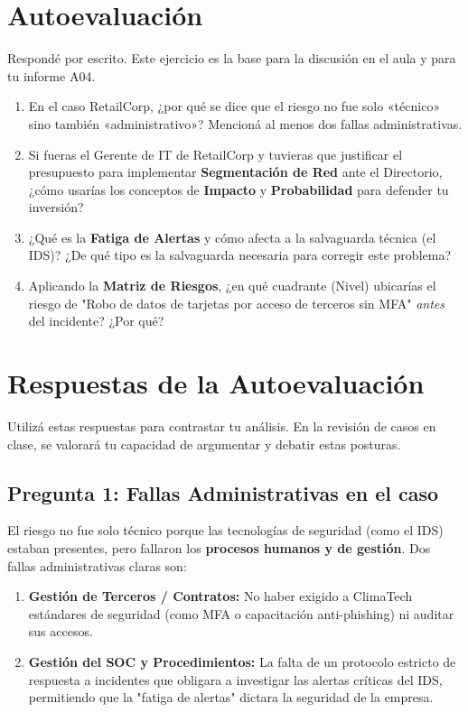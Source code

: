 \documentclass[11pt,a4paper]{article}
\begin{document}
\section{Autoevaluación}\label{sec:autoeval}
Respondé por escrito. Este ejercicio es la base para la discusión en el aula y para tu informe A04.

\begin{enumerate}[leftmargin=*]
  \item En el caso RetailCorp, ¿por qué se dice que el riesgo no fue solo «técnico» sino también «administrativo»? Mencioná al menos dos fallas administrativas.
  \item Si fueras el Gerente de IT de RetailCorp y tuvieras que justificar el presupuesto para implementar \textbf{Segmentación de Red} ante el Directorio, ¿cómo usarías los conceptos de \textbf{Impacto} y \textbf{Probabilidad} para defender tu inversión?
  \item ¿Qué es la \textbf{Fatiga de Alertas} y cómo afecta a la salvaguarda técnica (el IDS)? ¿De qué tipo es la salvaguarda necesaria para corregir este problema?
  \item Aplicando la \textbf{Matriz de Riesgos}, ¿en qué cuadrante (Nivel) ubicarías el riesgo de "Robo de datos de tarjetas por acceso de terceros sin MFA" \textit{antes} del incidente? ¿Por qué?
\end{enumerate}

\section{Respuestas de la Autoevaluación}\label{sec:respuestas}

\begin{clave}
Utilizá estas respuestas para contrastar tu análisis. En la revisión de casos en clase, se valorará tu capacidad de argumentar y debatir estas posturas.
\end{clave}

\subsection*{Pregunta 1: Fallas Administrativas en el caso}
\begin{respuesta}
El riesgo no fue solo técnico porque las tecnologías de seguridad (como el IDS) estaban presentes, pero fallaron los \textbf{procesos humanos y de gestión}. 
Dos fallas administrativas claras son:
\begin{enumerate}
  \item \textbf{Gestión de Terceros / Contratos:} No haber exigido a ClimaTech estándares de seguridad (como MFA o capacitación anti-phishing) ni auditar sus accesos.
  \item \textbf{Gestión del SOC y Procedimientos:} La falta de un protocolo estricto de respuesta a incidentes que obligara a investigar las alertas críticas del IDS, permitiendo que la "fatiga de alertas" dictara la seguridad de la empresa.
\end{enumerate}
\end{respuesta}
\end{document}
